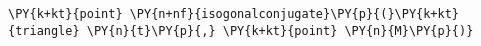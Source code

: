 \begin{Verbatim}[commandchars=\\\{\}]
    \PY{k+kt}{point} \PY{n+nf}{isogonalconjugate}\PY{p}{(}\PY{k+kt}{triangle} \PY{n}{t}\PY{p}{,} \PY{k+kt}{point} \PY{n}{M}\PY{p}{)}
\end{Verbatim}
